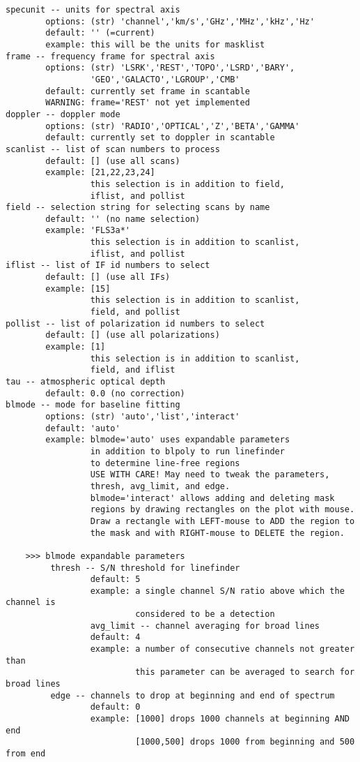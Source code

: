 \begin{verbatim}
specunit -- units for spectral axis
        options: (str) 'channel','km/s','GHz','MHz','kHz','Hz'
        default: '' (=current)
        example: this will be the units for masklist
frame -- frequency frame for spectral axis
        options: (str) 'LSRK','REST','TOPO','LSRD','BARY',
                 'GEO','GALACTO','LGROUP','CMB'
        default: currently set frame in scantable
        WARNING: frame='REST' not yet implemented
doppler -- doppler mode
        options: (str) 'RADIO','OPTICAL','Z','BETA','GAMMA'
        default: currently set to doppler in scantable
scanlist -- list of scan numbers to process
        default: [] (use all scans)
        example: [21,22,23,24]  
                 this selection is in addition to field,
                 iflist, and pollist
field -- selection string for selecting scans by name
        default: '' (no name selection)
        example: 'FLS3a*'
                 this selection is in addition to scanlist,
                 iflist, and pollist
iflist -- list of IF id numbers to select
        default: [] (use all IFs)
        example: [15]
                 this selection is in addition to scanlist,
                 field, and pollist
pollist -- list of polarization id numbers to select
        default: [] (use all polarizations)
        example: [1]
                 this selection is in addition to scanlist,
                 field, and iflist
tau -- atmospheric optical depth
        default: 0.0 (no correction)
blmode -- mode for baseline fitting
        options: (str) 'auto','list','interact'
        default: 'auto'
        example: blmode='auto' uses expandable parameters 
                 in addition to blpoly to run linefinder
                 to determine line-free regions
                 USE WITH CARE! May need to tweak the parameters,
                 thresh, avg_limit, and edge.
                 blmode='interact' allows adding and deleting mask 
                 regions by drawing rectangles on the plot with mouse. 
                 Draw a rectangle with LEFT-mouse to ADD the region to 
                 the mask and with RIGHT-mouse to DELETE the region. 
       
    >>> blmode expandable parameters
         thresh -- S/N threshold for linefinder
                 default: 5
                 example: a single channel S/N ratio above which the channel is
                          considered to be a detection
                 avg_limit -- channel averaging for broad lines
                 default: 4
                 example: a number of consecutive channels not greater than
                          this parameter can be averaged to search for broad lines
         edge -- channels to drop at beginning and end of spectrum
                 default: 0
                 example: [1000] drops 1000 channels at beginning AND end
                          [1000,500] drops 1000 from beginning and 500 from end
                

\end{verbatim}
